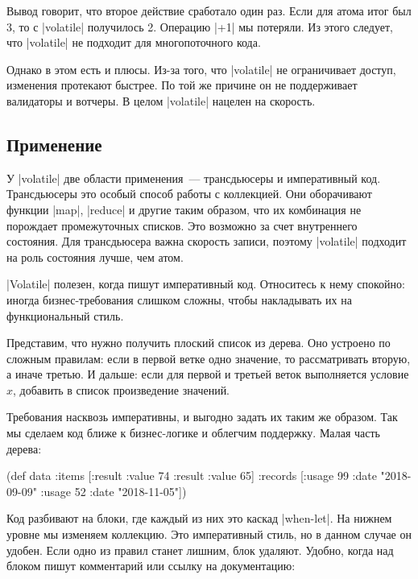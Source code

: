 Вывод говорит, что второе действие сработало один раз. Если для атома итог был
3, то с \spverb|volatile| получилось 2. Операцию \spverb|+1| мы потеряли. Из
этого следует, что \spverb|volatile| не подходит для многопоточного кода.

Однако в этом есть и плюсы. Из-за того, что \spverb|volatile| не ограничивает
доступ, изменения протекают быстрее. По той же причине он не поддерживает
валидаторы и вотчеры. В целом \spverb|volatile| нацелен на скорость.

\subsection{Применение}


У \spverb|volatile| две области применения~--- трансдьюсеры и императивный
код. Трансдьюсеры это особый способ работы с коллекцией. Они оборачивают функции
\spverb|map|, \spverb|reduce| и другие таким образом, что их комбинация не
порождает промежуточных списков. Это возможно за счет внутреннего состояния. Для
трансдьюсера важна скорость записи, поэтому \spverb|volatile| подходит на роль
состояния лучше, чем атом.

\spverb|Volatile| полезен, когда пишут императивный код. Относитесь к нему
спокойно: иногда бизнес-требования слишком сложны, чтобы накладывать их на
функциональный стиль.

Представим, что нужно получить плоский список из дерева. Оно устроено по сложным
правилам: если в первой ветке одно значение, то рассматривать вторую, а иначе
третью. И дальше: если для первой и третьей веток выполняется условие $x$,
добавить в список произведение значений.


Требования насквозь императивны, и выгодно задать их таким же образом. Так мы
сделаем код ближе к бизнес-логике и облегчим поддержку. Малая часть дерева:

\begin{english}
  \begin{clojure}
(def data
  {:items [{:result {:value 74}}
           {:result {:value 65}}]
   :records [{:usage 99 :date "2018-09-09"}
             {:usage 52 :date "2018-11-05"}]})
  \end{clojure}
\end{english}

Код разбивают на блоки, где каждый из них это каскад \spverb|when-let|. На
нижнем уровне мы изменяем коллекцию. Это императивный стиль, но в данном случае
он удобен. Если одно из правил станет лишним, блок удаляют. Удобно, когда над
блоком пишут комментарий или ссылку на документацию:

